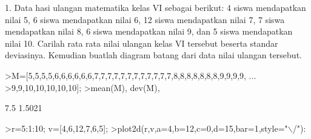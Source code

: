 \documentclass{article}
\begin{document}
\begin{eulernotebook}
\begin{euleroutput}
  [0.34485,  0.080751,  0.87652,  0.75416,  0.68839]
\end{euleroutput}
\begin{eulercomment}
1. Data hasi ulangan matematika kelas VI sebagai berikut: 4 siswa
mendapatkan nilai 5, 6 siswa mendapatkan nilai 6, 12 siswa mendapatkan
nilai 7, 7 siswa mendapatkan nilai 8, 6 siswa mendapatkan nilai 9, dan
5 siswa mendapatkan nilai 10. Carilah rata rata nilai ulangan kelas VI
tersebut beserta standar deviasinya. Kemudian buatlah diagram batang
dari data nilai ulangan tersebut.
\end{eulercomment}
\begin{eulerprompt}
>M=[5,5,5,5,6,6,6,6,6,6,7,7,7,7,7,7,7,7,7,7,7,7,8,8,8,8,8,8,8,9,9,9,9, ...
>9,9,10,10,10,10,10];
>mean(M), dev(M),
\end{eulerprompt}
\begin{euleroutput}
  7.5
  1.5021
\end{euleroutput}
\begin{eulerprompt}
>r=5:1:10; v=[4,6,12,7,6,5];
>plot2d(r,v,a=4,b=12,c=0,d=15,bar=1,style="\(\backslash\)/"):
\end{eulerprompt}
\end{eulernotebook}
\end{document}
